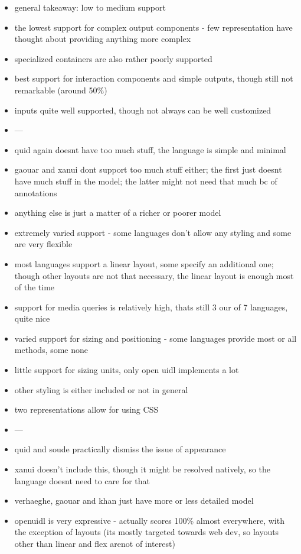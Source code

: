 \begin{itemize}
    \item general takeaway: low to medium support
    \item the lowest support for complex output components - few representation have thought about providing anything more complex
    \item specialized containers are also rather poorly supported
    \item best support for interaction components and simple outputs, though still not remarkable (around 50\%)
    \item inputs quite well supported, though not always can be well customized
    \item ---
    \item quid again doesnt have too much stuff, the language is simple and minimal
    \item gaouar and xanui dont support too much stuff either; the first just doesnt have much stuff in the model; the latter might not need that much bc of annotations
    \item anything else is just a matter of a richer or poorer model
\end{itemize}

\begin{itemize}
    \item extremely varied support - some languages don't allow any styling and some are very flexible
    \item most languages support a linear layout, some specify an additional one; though other layouts are not that necessary, the linear layout is enough most of the time
    \item support for media queries is relatively high, thats still 3 our of 7 languages, quite nice
    \item varied support for sizing and positioning - some languages provide most or all methods, some none
    \item little support for sizing units, only open uidl implements a lot
    \item other styling is either included or not in general
    \item two representations allow for using CSS
    \item ---
    \item quid and soude practically dismiss the issue of appearance
    \item xanui doesn't include this, though it might be resolved natively, so the language doesnt need to care for that
    \item verhaeghe, gaouar and khan just have more or less detailed model
    \item openuidl is very expressive - actually scores 100\% almost everywhere, with the exception of layouts (its mostly targeted towards web dev, so layouts other than linear and flex arenot of interest)
\end{itemize}


